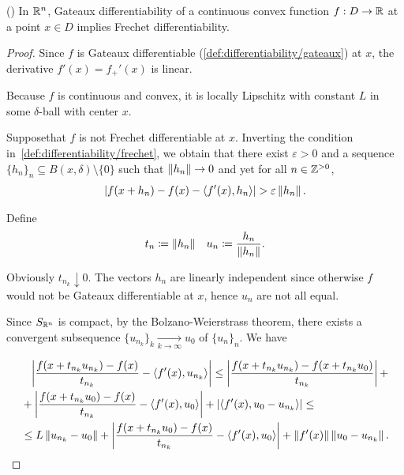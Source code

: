 \begin{theorem}\label{thm:rn_continuous_convex_gateaux_implies_frechet}(\cite[exercise 1.15(a)]{Phelps1993})
  In $\mathbb{R}^n$, Gateaux differentiability of a continuous convex function $f: D \to \mathbb{R}$ at a point $x \in D$ implies Frechet differentiability.
\end{theorem}
\begin{proof}
  Since $f$ is Gateaux differentiable (\cref{def:differentiability/gateaux}) at $x$, the derivative $f'(x) = f_+'(x)$ is linear.

  Because $f$ is continuous and convex, it is locally Lipschitz with constant $L$ in some $\delta$-ball with center $x$.

  Suppose\LEM that $f$ is not Frechet differentiable at $x$. Inverting the condition in~\cref{def:differentiability/frechet}, we obtain that there exist $\varepsilon > 0$ and a sequence $\{ h_n \}_n \subseteq B(x, \delta) \setminus \{ 0 \}$ such that $\left\Vert h_n \right\Vert \to 0$ and yet for all $n \in \mathbb{Z}^{>0}$,
  \begin{align}\label{thm:rn_continuous_convex_gateaux_implies_frechet/frechet_assumption}
    \left\vert f(x + h_n) - f(x) - \left\langle f'(x), h_n \right\rangle \right\vert > \varepsilon \left\Vert h_n \right\Vert.
  \end{align}

  Define
  \begin{align*}
    t_n \coloneqq \left\Vert h_n \right\Vert
    &&
    u_n \coloneqq \frac{h_n} {\left\Vert h_n \right\Vert}.
  \end{align*}

  Obviously $t_{n_k} \downarrow 0$. The vectors $h_n$ are linearly independent since otherwise $f$ would not be Gateaux differentiable at $x$, hence $u_n$ are not all equal.

  Since $S_{\mathbb{R}^n}$ is compact\USC, by the Bolzano-Weierstrass theorem, there exists a convergent subsequence $\{ u_{n_k} \}_k \underset {k \to \infty} \to u_0$ of $\{ u_n \}_n$. We have

  \begin{align}\label{thm:rn_continuous_convex_gateaux_implies_frechet/frechet_estimate}
    &\phantom= \Abs{\frac {f(x + t_{n_k} u_{n_k}) - f(x)} {t_{n_k}} - \Prod{f'(x)} {u_{n_k}}}
    \leq \nonumber
    \Abs{\frac {f(x + t_{n_k} u_{n_k}) - f(x + t_{n_k} u_0)} {t_{n_k}}} + \\ &+ \Abs{\frac {f(x + t_{n_k} u_0) - f(x)} {t_{n_k}} - \Prod{f'(x)} {u_0}} + \Abs{\Prod{f'(x)} {u_0 - u_{n_k}}}
    \leq \nonumber \\ &\leq
    L \Norm{u_{n_k} - u_0} + \Abs{\frac {f(x + t_{n_k} u_0) - f(x)} {t_{n_k}} - \Prod{f'(x)} {u_0}} + \Norm{f'(x)} \Norm{u_0 - u_{n_k}}.
  \end{align}


\end{proof}
